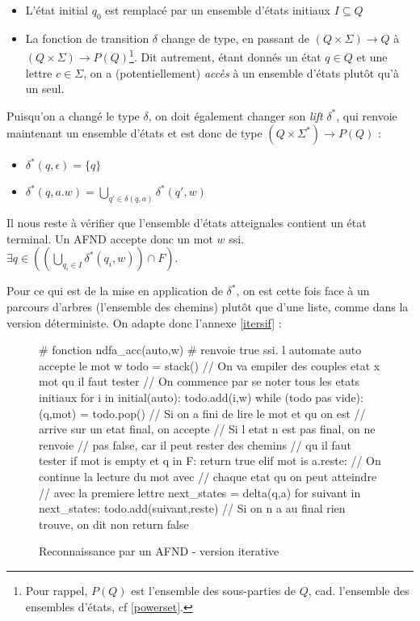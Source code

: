 \begin{itemize}
\item L'état initial $q_0$ est remplacé par un ensemble d'états initiaux $I \subseteq Q$
\item La fonction de transition $\delta$ change de type, en passant de $(Q \times \Sigma) \rightarrow Q$ à $(Q \times \Sigma) \rightarrow P(Q)$\footnote{Pour rappel, $P(Q)$ est l'ensemble des sous-parties de $Q$, cad. l'ensemble des ensembles d'états, cf \ref{powerset}.}. Dit autrement, étant donnés un état $q \in Q$ et une lettre $c \in \Sigma$, on a (potentiellement) \textit{accès} à un ensemble d'états plutôt qu'à un seul.
\end{itemize}


Puisqu'on a changé le type $\delta$, on doit également changer son \textit{lift} $\delta^*$, qui renvoie maintenant un ensemble d'états et est donc de type $(Q \times \Sigma^*) \rightarrow P(Q)$ :
 
\begin{itemize}
\item $\delta^*(q,\epsilon) = \{q\}$
\item $\delta^*(q,a.w) = \bigcup_{q' \in \delta(q,a)} \delta^*(q',w)$
\end{itemize}

Il nous reste à vérifier que l'ensemble d'états atteignales contient un état terminal. Un AFND accepte donc un mot $w$ ssi. $\exists q \in ((\bigcup_{q_i \in I} \delta^*(q_i,w)) \cap F)$.

Pour ce qui est de la mise en application de $\delta^*$, on est cette fois face à un parcours d'arbres (l'ensemble des chemins) plutôt que d'une liste, comme dans la version déterministe. On adapte donc l'annexe \ref{itersif} :

\begin{figure}[!ht]
\begin{python}
# fonction ndfa_acc(auto,w)
# renvoie true ssi. l automate auto accepte le mot w
todo = stack()
// On va empiler des couples etat x mot qu il faut tester
// On commence par se noter tous les etats initiaux
for i in initial(auto):
    todo.add(i,w)
while (todo pas vide):
    (q,mot) = todo.pop()
    // Si on a fini de lire le mot et qu on est
    // arrive sur un etat final, on accepte
    // Si l etat n est pas final, on ne renvoie
    // pas false, car il peut rester des chemins
    // qu il faut tester
    if mot is empty et q in F:
        return true 
    elif mot is a.reste:
        // On continue la lecture du mot avec 
        // chaque etat qu on peut atteindre
        // avec la premiere lettre
        next_states = delta(q,a)
        for suivant in next_states:
            todo.add(suivant,reste)
// Si on n a au final rien trouve, on dit non
return false
\end{python}
\caption{Reconnaissance par un AFND - version iterative}
\end{figure}

